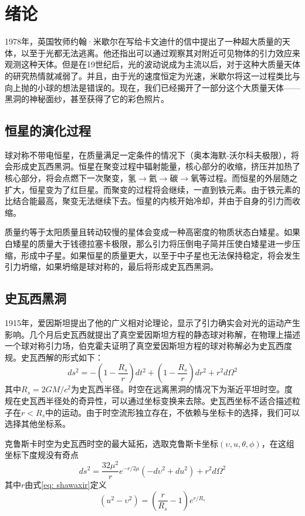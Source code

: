 \chapter{绪论}

1978年，英国牧师约翰·米歇尔在写给卡文迪什的信中提出了一种超大质量的天体，以至于光都无法逃离\citep{michell1784vii}。他还指出可以通过观察其对附近可见物体的引力效应来观测这种天体。但是在19世纪后，光的波动说成为主流以后，对于这种大质量天体的研究热情就减弱了。并且，由于光的速度恒定为光速，米歇尔将这一过程类比与向上抛的小球的想法是错误的。现在，我们已经揭开了一部分这个大质量天体——黑洞的神秘面纱，甚至获得了它的彩色照片\citep{akiyama2021first}。

\section{恒星的演化过程}
球对称不带电恒星，在质量满足一定条件的情况下（奥本海默-沃尔科夫极限），将会形成史瓦西黑洞。恒星在聚变过程中辐射能量，核心部分的收缩，挤压并加热了核心部分，将会点燃下一次聚变，氢$\rightarrow$氦$\rightarrow$碳$\rightarrow$氧等过程。而恒星的外层随之扩大，恒星变为了红巨星。而聚变的过程将会继续，一直到铁元素。由于铁元素的比结合能最高，聚变无法继续下去。恒星的内核开始冷却，并由于自身的引力而收缩。

质量约等于太阳质量且转动较慢的星体会变成一种高密度的物质状态白矮星。如果白矮星的质量大于钱德拉塞卡极限，那么引力将压倒电子简并压使白矮星进一步压缩，形成中子星。如果恒星的质量更大，以至于中子星也无法保持稳定，将会发生引力坍缩，如果坍缩是球对称的，最后将形成史瓦西黑洞。

\section{史瓦西黑洞}
1915年，爱因斯坦提出了他的广义相对论理论，显示了引力确实会对光的运动产生影响。几个月后史瓦西就提出了真空爱因斯坦方程的静态球对称解\citep{schwarzschild1916gravitationsfeld}，在物理上描述一个球对称引力场，伯克霍夫证明了真空爱因斯坦方程的球对称解必为史瓦西度规\citep{birkhoff1923relativity}。史瓦西解的形式如下：
\begin{equation}
    ds^2=-\left(1-\frac{R_s}{r}\right)dt^2+\left(1-\frac{R_s}{r}\right)dr^2+r^2d\Omega^2
\end{equation}
其中$R_s=2GM/c^2$为史瓦西半径。时空在远离黑洞的情况下为渐近平坦时空。度规在史瓦西半径处的奇异性，可以通过坐标变换来去除。史瓦西坐标不适合描述粒子在$r<R_s$中的运动。由于时空流形独立存在，不依赖与坐标卡的选择，我们可以选择其他坐标系。

克鲁斯卡时空为史瓦西时空的最大延拓，选取克鲁斯卡坐标$\left(\upsilon, u, \theta, \phi\right)$，在这组坐标下度规没有奇点
\begin{equation}
    ds^2=\frac{32\mu^2}{r} e^{-r/2\mu}\left(-d\upsilon^2+du^2 \right)+r^2d\Omega^2
\end{equation}
其中$r$由式\eqref{eq: shawaxir}定义
\begin{equation}\label{eq: shawaxir}
    \left(u^2-\upsilon^2\right)=\left(\frac{r}{R_s}-1\right)e^{r/R_s}
\end{equation}

